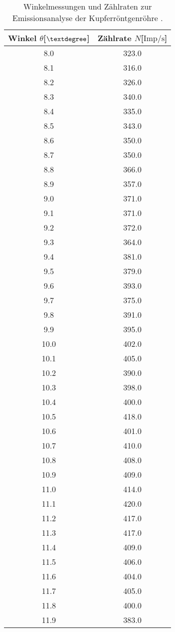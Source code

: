 \begin{table}\tiny
\caption{Winkelmessungen und Zählraten zur Emissionsanalyse der Kupferröntgenröhre \cite{hinweis}.}
\begin{minipage}{0.5\textwidth}
\centering
\label{tab:cuwerte1}
\begin{tabular}{c c}
    \toprule
    Winkel $\theta$[$\textdegree$] & Zählrate $N$[$\si{{\text{Imp}}\per\second}$]\\
    \midrule
8.0		&323.0\\
8.1		&316.0\\
8.2		&326.0\\
8.3		&340.0\\
8.4		&335.0\\
8.5		&343.0\\
8.6		&350.0\\
8.7		&350.0\\
8.8		&366.0\\
8.9		&357.0\\
9.0		&371.0\\
9.1		&371.0\\
9.2		&372.0\\
9.3		&364.0\\
9.4		&381.0\\
9.5		&379.0\\
9.6		&393.0\\
9.7		&375.0\\
9.8		&391.0\\
9.9		&395.0\\
10.0		&402.0\\
10.1		&405.0\\
10.2		&390.0\\
10.3		&398.0\\
10.4		&400.0\\
10.5		&418.0\\
10.6		&401.0\\
10.7		&410.0\\
10.8		&408.0\\
10.9		&409.0\\
11.0		&414.0\\
11.1		&420.0\\
11.2		&417.0\\
11.3		&417.0\\
11.4		&409.0\\
11.5		&406.0\\
11.6		&404.0\\
11.7		&405.0\\
11.8		&400.0\\
11.9		&383.0\\

\end{tabular}
\end{minipage}
\end{table}
